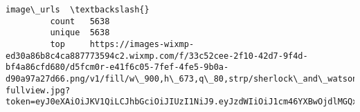 \documentclass[11pt]{article}
\begin{document}
\begin{Verbatim}[commandchars=\\\{\}]
                                                                                                                                                                                                                                                                                                                                                                                                                                                                                                                                                                                                                                                                                                                              image\_urls  \textbackslash{}
         count   5638                                                                                                                                                                                                                                                                                                                                                                                                                                                                                                                                                                                                                                                                                                                      
         unique  5638                                                                                                                                                                                                                                                                                                                                                                                                                                                                                                                                                                                                                                                                                                                      
         top     https://images-wixmp-ed30a86b8c4ca887773594c2.wixmp.com/f/33c52cee-2f10-42d7-9f4d-bf4a86cfd680/d5fcm0r-e41f6c05-7fef-4fe5-9b0a-d90a97a27d66.png/v1/fill/w\_900,h\_673,q\_80,strp/sherlock\_and\_watson\_by\_tagoston16\_d5fcm0r-fullview.jpg?token=eyJ0eXAiOiJKV1QiLCJhbGciOiJIUzI1NiJ9.eyJzdWIiOiJ1cm46YXBwOjdlMGQxODg5ODIyNjQzNzNhNWYwZDQxNWVhMGQyNmUwIiwiaXNzIjoidXJuOmFwcDo3ZTBkMTg4OTgyMjY0MzczYTVmMGQ0MTVlYTBkMjZlMCIsIm9iaiI6W1t7ImhlaWdodCI6Ijw9NjczIiwicGF0aCI6IlwvZlwvMzNjNTJjZWUtMmYxMC00MmQ3LTlmNGQtYmY0YTg2Y2ZkNjgwXC9kNWZjbTByLWU0MWY2YzA1LTdmZWYtNGZlNS05YjBhLWQ5MGE5N2EyN2Q2Ni5wbmciLCJ3aWR0aCI6Ijw9OTAwIn1dXSwiYXVkIjpbInVybjpzZXJ2aWNlOmltYWdlLm9wZXJhdGlvbnMiXX0.aAUSmP2Wi0yoYtwGKHNaPJH2gAXjJx9YEcjgD00hQM4   

\end{Verbatim}
\end{document}
